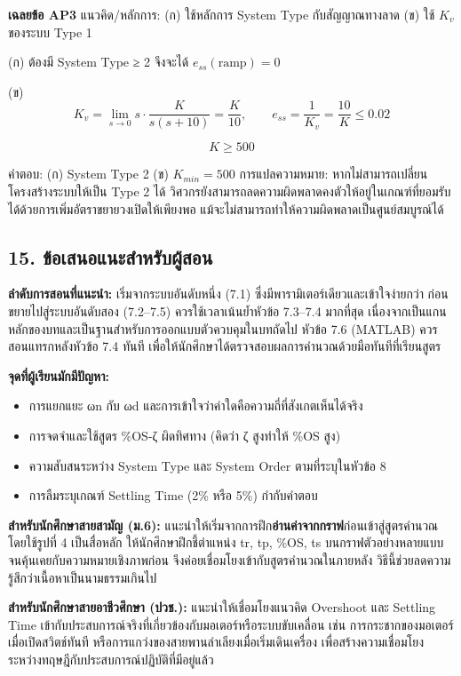 \textbf{เฉลยข้อ AP3}
แนวคิด/หลักการ: (ก) ใช้หลักการ System Type กับสัญญาณทางลาด (ข) ใช้ $K_v$ ของระบบ Type 1

(ก) ต้องมี System Type ≥ 2 จึงจะได้ $e_{ss}(\text{ramp})=0$

(ข)
\[
K_v=\lim_{s\to0}s\cdot\frac{K}{s(s+10)}=\frac{K}{10}, \qquad e_{ss}=\frac{1}{K_v}=\frac{10}{K}\le0.02
\]

\[
K\ge500
\]

คำตอบ: (ก) System Type 2 (ข) $K_{min}=500$
การแปลความหมาย: หากไม่สามารถเปลี่ยนโครงสร้างระบบให้เป็น Type 2 ได้ วิศวกรยังสามารถลดความผิดพลาดคงตัวให้อยู่ในเกณฑ์ที่ยอมรับได้ด้วยการเพิ่มอัตราขยายวงเปิดให้เพียงพอ แม้จะไม่สามารถทำให้ความผิดพลาดเป็นศูนย์สมบูรณ์ได้



\subsection{15. ข้อเสนอแนะสำหรับผู้สอน}

\textbf{ลำดับการสอนที่แนะนำ:} เริ่มจากระบบอันดับหนึ่ง (7.1) ซึ่งมีพารามิเตอร์เดียวและเข้าใจง่ายกว่า ก่อนขยายไปสู่ระบบอันดับสอง (7.2–7.5) ควรใช้เวลาเน้นย้ำหัวข้อ 7.3–7.4 มากที่สุด เนื่องจากเป็นแกนหลักของบทและเป็นฐานสำหรับการออกแบบตัวควบคุมในบทถัดไป หัวข้อ 7.6 (MATLAB) ควรสอนแทรกหลังหัวข้อ 7.4 ทันที เพื่อให้นักศึกษาได้ตรวจสอบผลการคำนวณด้วยมือทันทีที่เรียนสูตร

\textbf{จุดที่ผู้เรียนมักมีปัญหา:}

\begin{itemize}
    \item การแยกแยะ ωn กับ ωd และการเข้าใจว่าค่าใดคือความถี่ที่สังเกตเห็นได้จริง
    \item การจดจำและใช้สูตร \%OS-ζ ผิดทิศทาง (คิดว่า ζ สูงทำให้ \%OS สูง)
    \item ความสับสนระหว่าง System Type และ System Order ตามที่ระบุในหัวข้อ 8
    \item การลืมระบุเกณฑ์ Settling Time (2\% หรือ 5\%) กำกับคำตอบ
\end{itemize}

\textbf{สำหรับนักศึกษาสายสามัญ (ม.6):} แนะนำให้เริ่มจากการฝึก\textbf{อ่านค่าจากกราฟ}ก่อนเข้าสู่สูตรคำนวณ โดยใช้รูปที่ 4 เป็นสื่อหลัก ให้นักศึกษาฝึกชี้ตำแหน่ง tr, tp, \%OS, ts บนกราฟตัวอย่างหลายแบบ จนคุ้นเคยกับความหมายเชิงภาพก่อน จึงค่อยเชื่อมโยงเข้ากับสูตรคำนวณในภายหลัง วิธีนี้ช่วยลดความรู้สึกว่าเนื้อหาเป็นนามธรรมเกินไป

\textbf{สำหรับนักศึกษาสายอาชีวศึกษา (ปวช.):} แนะนำให้เชื่อมโยงแนวคิด Overshoot และ Settling Time เข้ากับประสบการณ์จริงที่เกี่ยวข้องกับมอเตอร์หรือระบบขับเคลื่อน เช่น การกระชากของมอเตอร์เมื่อเปิดสวิตช์ทันที หรือการแกว่งของสายพานลำเลียงเมื่อเริ่มเดินเครื่อง เพื่อสร้างความเชื่อมโยงระหว่างทฤษฎีกับประสบการณ์ปฏิบัติที่มีอยู่แล้ว

